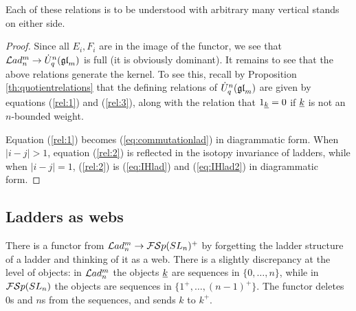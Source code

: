 \documentclass[10pt,leqno]{article}
\begin{document}
Each of these relations is to be understood with arbitrary many vertical stands on either side.

\begin{proof}
Since all $ E_i, F_i $ are in the image of the functor, we see that $ \mathcal{L}ad_n^m \rightarrow \dot{{{U}}}_q^n({\mathfrak{gl}}_m) $ is full (it is obviously dominant).  It remains to see that the above relations generate the kernel.  To see this, recall by Proposition \ref{th:quotientrelations} that the defining relations of $ \dot{{{U}}}_q^n({\mathfrak{gl}}_m) $ are given by equations (\ref{rel:1}) and (\ref{rel:3}), along with the relation that $ 1_{{\underline{k}}} = 0 $ if $ {\underline{k}} $ is not an $ n$-bounded weight.
 
Equation (\ref{rel:1}) becomes (\ref{eq:commutationlad}) in diagrammatic form.  When $ |i-j| > 1 $, equation (\ref{rel:2}) is reflected in the isotopy invariance of ladders, while when $ |i-j |= 1$, (\ref{rel:2}) is (\ref{eq:IHlad}) and (\ref{eq:IHlad2}) in diagrammatic form. 
\end{proof}

\subsection{Ladders as webs}\label{sec:psi}
There is a functor from $ \mathcal{L}ad_n^m \rightarrow {\mathcal{FS}p}(SL_n)^+$  by forgetting the ladder structure of a ladder and thinking of it as a web. There is a slightly discrepancy at the level of objects: in $\mathcal{L}ad_n^m$ the objects ${\underline{k}}$ are sequences in $\{0,\ldots,n\}$, while in ${\mathcal{FS}p}(SL_n)$ the objects are sequences in $\{1^+,\ldots,(n-1)^+\}$. The functor deletes $0$s and $n$s from the sequences, and sends $k$ to $k^+$.
\end{document}
